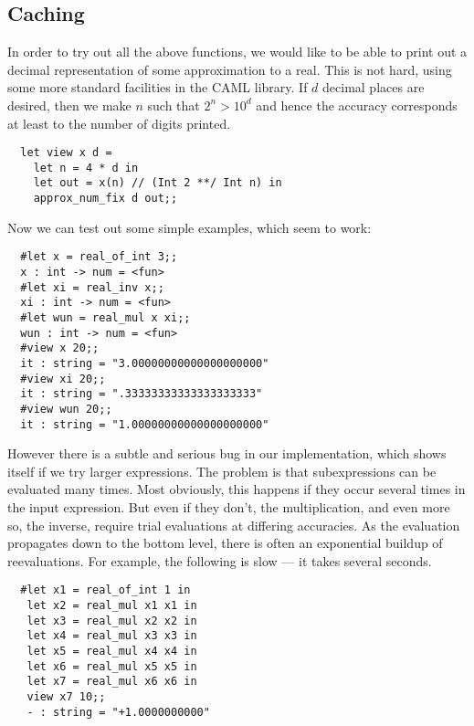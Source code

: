 \subsection{Caching}

In order to try out all the above functions, we would like to be able to print
out a decimal representation of some approximation to a real. This is not hard,
using some more standard facilities in the CAML library. If $d$ decimal places
are desired, then we make $n$ such that $2^n > 10^d$ and hence the accuracy
corresponds at least to the number of digits printed.

\begin{boxed}\begin{verbatim}
  let view x d =
    let n = 4 * d in
    let out = x(n) // (Int 2 **/ Int n) in
    approx_num_fix d out;;
\end{verbatim}\end{boxed}

Now we can test out some simple examples, which seem to work:

\begin{boxed}\begin{verbatim}
  #let x = real_of_int 3;;
  x : int -> num = <fun>
  #let xi = real_inv x;;
  xi : int -> num = <fun>
  #let wun = real_mul x xi;;
  wun : int -> num = <fun>
  #view x 20;;
  it : string = "3.00000000000000000000"
  #view xi 20;;
  it : string = ".33333333333333333333"
  #view wun 20;;
  it : string = "1.00000000000000000000"
\end{verbatim}\end{boxed}

However there is a subtle and serious bug in our implementation, which shows
itself if we try larger expressions. The problem is that subexpressions can be
evaluated many times. Most obviously, this happens if they occur several times
in the input expression. But even if they don't, the multiplication, and even
more so, the inverse, require trial evaluations at differing accuracies. As the
evaluation propagates down to the bottom level, there is often an exponential
buildup of reevaluations. For example, the following is slow --- it takes
several seconds.

\begin{boxed}\begin{verbatim}
  #let x1 = real_of_int 1 in
   let x2 = real_mul x1 x1 in
   let x3 = real_mul x2 x2 in
   let x4 = real_mul x3 x3 in
   let x5 = real_mul x4 x4 in
   let x6 = real_mul x5 x5 in
   let x7 = real_mul x6 x6 in
   view x7 10;;
   - : string = "+1.0000000000"
\end{verbatim}\end{boxed}

